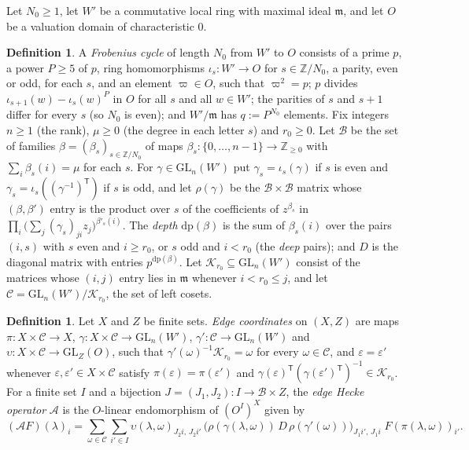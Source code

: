 \documentclass[reqno]{amsart}
\numberwithin{equation}{section}
\theoremstyle{plain}
\theoremstyle{definition}
\newtheorem{definition}[theorem]{Definition}
\theoremstyle{remark}
\newcommand{\Z}{\mathbb{Z}}
\newcommand{\GL}{\mathrm{GL}}
\newcommand{\Bc}{\mathcal B}
\newcommand{\Cc}{\mathcal C}
\newcommand{\Kc}{\mathcal K}
\newcommand{\Ac}{\mathcal A}
\newcommand{\dpt}{\mathrm{dp}}
\begin{document}
Let \(N_0 \ge 1\), let \(W'\) be a commutative local ring with maximal ideal \(\mathfrak m\), and let \(O\) be a valuation domain of characteristic \(0\).

\begin{definition}\label{def:cycle}
A \emph{Frobenius cycle} of length \(N_0\) from \(W'\) to \(O\) consists of a prime \(p\), a power \(P \ge 5\) of \(p\), ring homomorphisms \(\iota_s \colon W' \to O\) for \(s \in \Z/N_0\), a parity, even or odd, for each \(s\), and an element \(\varpi \in O\), such that \(\varpi^2 = p\); \(p\) divides \(\iota_{s+1}(w) - \iota_s(w)^P\) in \(O\) for all \(s\) and all \(w \in W'\); the parities of \(s\) and \(s+1\) differ for every \(s\) (so \(N_0\) is even); and \(W'/\mathfrak m\) has \(q := P^{N_0}\) elements.  Fix integers \(n \ge 1\) (the rank), \(\mu \ge 0\) (the degree in each letter \(s\)) and \(r_0 \ge 0\).  Let \(\Bc\) be the set of families \(\beta = (\beta_s)_{s \in \Z/N_0}\) of maps \(\beta_s \colon \{0, \dots, n-1\} \to \Z_{\ge 0}\) with \(\sum_i \beta_s(i) = \mu\) for each \(s\).  For \(\gamma \in \GL_n(W')\) put \(\gamma_s = \iota_s(\gamma)\) if \(s\) is even and \(\gamma_s = \iota_s((\gamma^{-1})^{\mathsf T})\) if \(s\) is odd, and let \(\rho(\gamma)\) be the \(\Bc \times \Bc\) matrix whose \((\beta, \beta')\) entry is the product over \(s\) of the coefficients of \(z^{\beta_s}\) in \(\prod_i \bigl(\sum_j (\gamma_s)_{ji} z_j\bigr)^{\beta'_s(i)}\).  The \emph{depth} \(\dpt(\beta)\) is the sum of \(\beta_s(i)\) over the pairs \((i, s)\) with \(s\) even and \(i \ge r_0\), or \(s\) odd and \(i < r_0\) (the \emph{deep} pairs); and \(D\) is the diagonal matrix with entries \(p^{\dpt(\beta)}\).  Let \(\Kc_{r_0} \subseteq \GL_n(W')\) consist of the matrices whose \((i, j)\) entry lies in \(\mathfrak m\) whenever \(i < r_0 \le j\), and let \(\Cc = \GL_n(W')/\Kc_{r_0}\), the set of left cosets.
\end{definition}

\begin{definition}\label{def:edge}
Let \(X\) and \(Z\) be finite sets.  \emph{Edge coordinates} on \((X, Z)\) are maps \(\pi \colon X \times \Cc \to X\), \(\gamma \colon X \times \Cc \to \GL_n(W')\), \(\gamma' \colon \Cc \to \GL_n(W')\) and \(\upsilon \colon X \times \Cc \to \GL_Z(O)\), such that \(\gamma'(\omega)^{-1} \Kc_{r_0} = \omega\) for every \(\omega \in \Cc\), and \(\varepsilon = \varepsilon'\) whenever \(\varepsilon, \varepsilon' \in X \times \Cc\) satisfy \(\pi(\varepsilon) = \pi(\varepsilon')\) and \(\gamma(\varepsilon)^{\mathsf T} (\gamma(\varepsilon')^{\mathsf T})^{-1} \in \Kc_{r_0}\).  For a finite set \(I\) and a bijection \(J = (J_1, J_2) \colon I \to \Bc \times Z\), the \emph{edge Hecke operator} \(\Ac\) is the \(O\)-linear endomorphism of \((O^I)^X\) given by
\[
  (\Ac F)(\lambda)_i = \sum_{\omega \in \Cc} \sum_{i' \in I} \upsilon(\lambda, \omega)_{J_2 i,\, J_2 i'}\, \bigl(\rho(\gamma(\lambda, \omega))\, D\, \rho(\gamma'(\omega))\bigr)_{J_1 i',\, J_1 i}\; F(\pi(\lambda, \omega))_{i'} .
\]
\end{definition}
\end{document}
